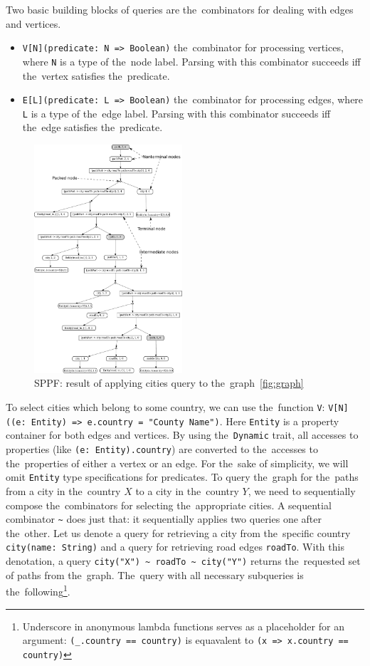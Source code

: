 Two basic building blocks of queries are the~combinators for dealing with edges and vertices.
\begin{itemize}
    \item \lstinline{V[N](predicate: N => Boolean)} the~combinator for processing vertices, where \lstinline{N} is a type of the~node label.
    Parsing with this combinator succeeds iff the~vertex satisfies the~predicate.
    \item \lstinline{E[L](predicate: L => Boolean)} the~combinator for processing edges, where \lstinline{L} is a type of the~edge label.
    Parsing with this combinator succeeds iff the~edge satisfies the~predicate.
\end{itemize}

\begin{figure}[t]
\includegraphics[width=0.49\textwidth]{sppf}
\caption{SPPF: result of applying cities query to the~graph~\ref{fig:graph}}
\label{fig:sppf}
\end{figure}

To select cities which belong to some country, we can use the~function \lstinline{V}: \lstinline{V[N]((e: Entity) => e.country = "County Name")}.
Here \lstinline{Entity} is a property container for both edges and vertices.
By using the~\lstinline{Dynamic} trait, all accesses to properties (like \lstinline{(e: Entity).country}) are converted to the~accesses to the~properties of either a vertex or an edge.
For the~sake of simplicity, we will omit \lstinline{Entity} type specifications for predicates.
To query the~graph for the~paths from a city in the~country $X$ to a city in the~country $Y$, we need to sequentially compose the~combinators for selecting the~appropriate cities.
A sequential combinator \lstinline{~} does just that: it sequentially  applies two queries one after the~other.
Let us denote a query for retrieving a city from the~specific country \lstinline{city(name: String)} and a query for retrieving road edges \lstinline{roadTo}.
With this denotation, a query \lstinline{city("X") ~ roadTo ~ city("Y")} returns the~requested set of paths from the~graph.
The~query with all necessary subqueries is the~following\footnote{Underscore in anonymous lambda functions serves as a placeholder for an argument: \lstinline{(_.country == country)} is equavalent to \lstinline{(x => x.country == country)} }.

